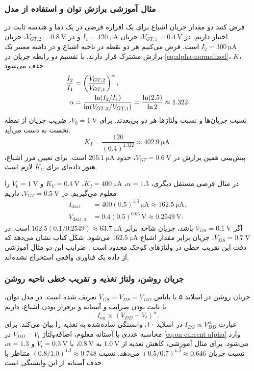 \subsubsection*{مثال آموزشی برازش توان و استفاده از مدل}
فرض کنید دو مقدار جریان اشباع برای یک افزاره فرضی در یک دما و هندسه
ثابت در اختیار داریم. در \(V_{GT,1}=\qty{0.4}{\volt}\)، جریان
\(I_1=\qty{120}{\micro\ampere}\) و در
\(V_{GT,2}=\qty{0.8}{\volt}\)، جریان
\(I_2=\qty{300}{\micro\ampere}\) است. فرض می‌کنیم هر دو نقطه در ناحیه
اشباع و در دامنه معتبر یک برازش مشترک قرار دارند. با تقسیم دو رابطه
جریان در \eqref{eq:alpha-normalized}، \(K_I\) حذف می‌شود
\begin{align}
 \frac{I_2}{I_1}&=\left(\frac{V_{GT,2}}{V_{GT,1}}\right)^\alpha,\notag\\
 \alpha&=\frac{\ln(I_2/I_1)}{\ln(V_{GT,2}/V_{GT,1})}
 =\frac{\ln(2.5)}{\ln2}\approx1.322.
 \label{eq:alpha-fit}
\end{align}
نسبت جریان‌ها و نسبت ولتاژها هر دو بی‌بعدند. برای \(V_0=\qty{1}{\volt}\)،
ضریب جریان از نقطه نخست به دست می‌آید.
\[
 K_I=\frac{120}{(0.4)^{1.322}}\approx\qty{402.9}{\micro\ampere}.
\]
پیش‌بینی همین برازش در \(V_{GT}=\qty{0.6}{\volt}\)،
حدود \(\qty{205.1}{\micro\ampere}\) است. برای تعیین مرز اشباع، هنوز
داده‌ای برای \(K_V\) لازم است.

در مثال فرضی مستقل دیگری، \(\alpha=1.3\)،
\(K_I=\qty{400}{\micro\ampere}\)، \(K_V=\qty{0.4}{\volt}\) و
\(V_0=\qty{1}{\volt}\) را معلوم می‌گیریم. در
\(V_{GT}=\qty{0.5}{\volt}\)، داریم
\begin{align*}
 I_{\mathrm{dsat}}&=400(0.5)^{1.3}\,\unit{\micro\ampere}
 \approx\qty{162.5}{\micro\ampere},\\
 V_{\mathrm{dsat},\alpha}&=0.4(0.5)^{0.65}\,\unit{\volt}
 \approx\qty{0.2549}{\volt}.
\end{align*}
اگر \(V_{DS}=\qty{0.1}{\volt}\) باشد، جریان شاخه  برابر
\(162.5(0.1/0.2549)\approx\qty{63.7}{\micro\ampere}\) است.
در \(V_{DS}=\qty{0.7}{\volt}\)، جریان برابر مقدار اشباع
\(\qty{162.5}{\micro\ampere}\) می‌شود. شکل  کتاب نشان
می‌دهد که دقت این تقریب خطی در ولتاژهای کوچک  محدود است
\cite[صفحه چاپی ۷۸]{weste}. ضرایب این دو مثال آموزشی از داده یک فناوری
واقعی استخراج نشده‌اند.

\subsubsection*{جریان روشن، ولتاژ تغذیه و تقریب خطی ناحیه روشن}
جریان روشن در اسلاید ۵ با بایاس \(V_{GS}=V_{DS}=V_{DD}\) تعریف شده
است. در مدل توان، با ثابت بودن ضرایب و آستانه و برقرار بودن اشباع، داریم
\begin{equation}
 I_{\mathrm{on}}\propto(V_{DD}-V_t)^\alpha.
 \label{eq:on-current-alpha}
\end{equation}
عبارت \(I_{DS}\propto V_{DD}^{\alpha}\) در اسلاید ۱۰، وابستگی ساده‌شده
به تغذیه را بیان می‌کند. برای محاسبه عددی با آستانه معلوم، اضافه‌ولتاژ
\(V_{DD}-V_t\) در \eqref{eq:on-current-alpha} وارد می‌شود.
برای مثال آموزشی، کاهش تغذیه از \(\qty{1.0}{\volt}\) به
\(\qty{0.8}{\volt}\)، با \(V_t=\qty{0.3}{\volt}\) و \(\alpha=1.3\)،
نسبت جریان \((0.5/0.7)^{1.3}\approx0.646\) می‌دهد. نسبت
\((0.8/1.0)^{1.3}\approx0.748\) متناظر با حذف آستانه از این وابستگی است.

